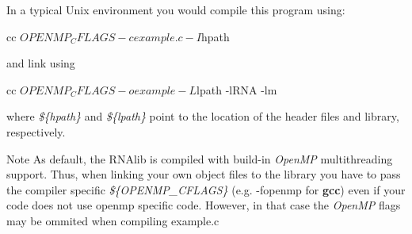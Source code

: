 In a typical Unix environment you would compile this program using\+: \begin{DoxyVerb}cc ${OPENMP_CFLAGS} -c example.c -I${hpath}
\end{DoxyVerb}
 and link using \begin{DoxyVerb}cc ${OPENMP_CFLAGS} -o example -L${lpath} -lRNA -lm
\end{DoxyVerb}
 where {\itshape \$\{hpath\}} and {\itshape \$\{lpath\}} point to the location of the header files and library, respectively. \begin{DoxyNote}{Note}
As default, the R\+N\+Alib is compiled with build-\/in {\itshape Open\+MP} multithreading support. Thus, when linking your own object files to the library you have to pass the compiler specific {\itshape \$\{O\+P\+E\+N\+M\+P\+\_\+\+C\+F\+L\+A\+GS\}} (e.\+g. \textquotesingle{}-\/fopenmp\textquotesingle{} for {\bfseries gcc}) even if your code does not use openmp specific code. However, in that case the {\itshape Open\+MP} flags may be ommited when compiling example.\+c 
\end{DoxyNote}
